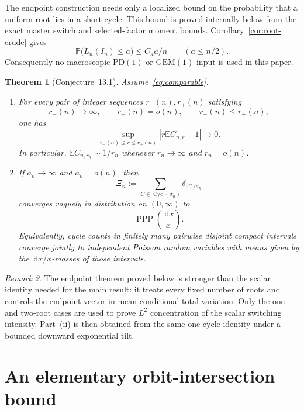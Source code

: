 \documentclass[11pt]{article}
\newcommand{\E}{\mathbb E}
\newcommand{\Pp}{\mathbb P}
\newcommand{\1}{\mathbf 1}
\newcommand{\PPP}{\operatorname{PPP}}
\newcommand{\Cyc}{\operatorname{Cyc}}
\newcommand{\dd}{\,\mathrm d}
\newtheorem{theorem}{Theorem}[section]
\theoremstyle{definition}
\theoremstyle{remark}
\newtheorem{remark}[theorem]{Remark}
\begin{document}
The endpoint construction needs only a localized bound on the probability
that a uniform root lies in a short cycle.  This bound is proved
internally below from the exact master switch and selected-factor moment
bounds.  Corollary~\ref{cor:root-crude} gives
\[
  \Pp\bigl(L_n(I_n)\leq a\bigr)\leq C_\kappa a/n
  \qquad(a\leq n/2).
\]
Consequently no macroscopic $\mathrm{PD}(1)$ or $\mathrm{GEM}(1)$ input
is used in this paper.

\begin{theorem}[Conjecture~13.1]\label{thm:main}
Assume~\eqref{eq:comparable}.

\begin{enumerate}[label=\textnormal{(\roman*)}]
\item For every pair of integer sequences $r_-(n),r_+(n)$ satisfying
\[
  r_-(n)\longrightarrow\infty,
  \qquad r_+(n)=o(n),
  \qquad r_-(n)\leq r_+(n),
\]
one has
\begin{equation}\label{eq:uniform-first-moment}
  \sup_{r_-(n)\leq r\leq r_+(n)}
  \left|r\E C_{n,r}-1\right|\longrightarrow0.
\end{equation}
In particular, $\E C_{n,r_n}\sim 1/r_n$ whenever
$r_n\to\infty$ and $r_n=o(n)$.

\item If $a_n\to\infty$ and $a_n=o(n)$, then
\begin{equation}\label{eq:point-process-def}
  \Xi_n:=\sum_{C\in\Cyc(\sigma_n)}\delta_{|C|/a_n}
\end{equation}
converges vaguely in distribution on $(0,\infty)$ to
\[
  \PPP\!\left(\frac{\dd x}{x}\right).
\]
Equivalently, cycle counts in finitely many pairwise disjoint compact
intervals converge jointly to independent Poisson random variables with
means given by the $\dd x/x$-masses of those intervals.
\end{enumerate}
\end{theorem}

\begin{remark}
The endpoint theorem proved below is stronger than the scalar identity
needed for the main result: it treats every fixed number of roots and
controls the endpoint vector in mean conditional total variation.  Only
the one- and two-root cases are used to prove $L^2$ concentration of the
scalar switching intensity.  Part~(ii) is then obtained from the same
one-cycle identity under a bounded downward exponential tilt.
\end{remark}

\section{An elementary orbit-intersection bound}
\end{document}
